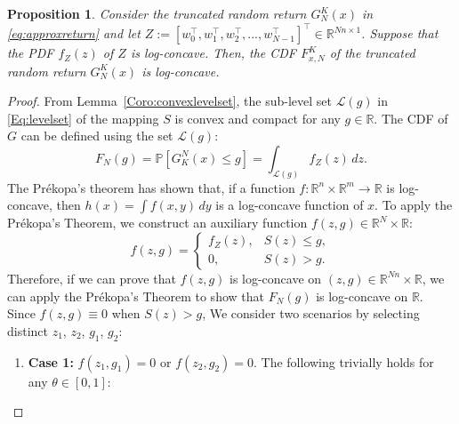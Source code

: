 \documentclass[letterpaper, 10 pt, conference]{ieeeconf}  %
\newtheorem{proposition}{Proposition}[section]
\begin{document}
\begin{proposition}
  \label{The:logconcave}
   Consider the truncated random return $G^K_N(x)$ in \eqref{eq:approxreturn} and let $Z:=\left[w_0^\top,w_1^\top,w_2^\top,...,w_{N-1}^\top\right]^\top\in \mathbb{R}^{N n\times 1}$.  Suppose that the PDF $f_Z(z)$ of $Z$  is log-concave. Then, the CDF ${F}^{K}_{x,N}$ of  the truncated random return $G^K_{N}(x)$ is log-concave.
\end{proposition}
\begin{proof}
From Lemma~\ref{Coro:convexlevelset}, the sub-level set  $\mathcal{L}(g)$  in \eqref{Eq:levelset} of the mapping $S$ is convex and compact for any $g\in \mathbb{R}$. The CDF of $G$ can be defined using the set $\mathcal{L}(g)$:
\begin{equation*}
    {F}_N(g) = \mathbb{P}[G^N_K(x) \leq g] = \int_{\mathcal{L}(g)} f_Z(z) \, dz.
\end{equation*}
The Pr\'ekopa's theorem has shown that, 
   if a function $ f: \mathbb{R}^n \times \mathbb{R}^m \to \mathbb{R} $ is log-concave, then $h(x) = \int f(x, y) \, dy$
is a log-concave function of \( x \).
To apply the Pr\'ekopa's Theorem, we construct an auxiliary function $f(z,g) \in \mathbb{R}^{N}\times \mathbb{R} $: 
\begin{equation*}
f(z,g)=
    \begin{cases}
        f_Z(z), & S(z)\leq g, \\
        0 ,& S(z)>g.
    \end{cases}
\end{equation*}
Therefore, if we can prove that $f(z,g)$ is log-concave on $(z,g)\in \mathbb{R}^{Nn} \times \mathbb{R}$, we can apply the Pr\'ekopa's Theorem to show that ${F}_N(g)$ is log-concave on $\mathbb{R}$.
Since $f(z,g)\equiv0$ when $S(z)>g$, We consider two scenarios by selecting distinct $z_1$, $z_2$, $g_1$, $g_2$:
\begin{enumerate}
  \item \textbf{Case 1:} $f(z_1,g_1)=0$ or $f(z_2,g_2)=0$.  %
  The following trivially holds for any $\theta\in[0,1]$: %
  \begin{equation*}

\end{equation*}
\end{enumerate}
\end{proof}
\end{document}
